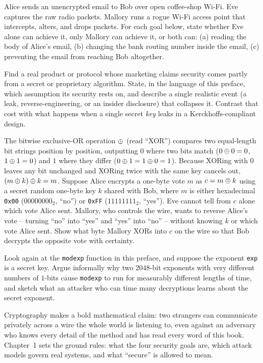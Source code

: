 \begin{exercise}
Alice sends an unencrypted email to Bob over open coffee-shop Wi-Fi. Eve captures the raw radio packets. Mallory runs a rogue Wi-Fi access point that intercepts, alters, and drops packets. For each goal below, state whether Eve alone can achieve it, only Mallory can achieve it, or both can: (a) reading the body of Alice's email, (b) changing the bank routing number inside the email, (c) preventing the email from reaching Bob altogether.
\end{exercise}

\begin{exercise}
Find a real product or protocol whose marketing claims security comes partly from a secret or proprietary algorithm. State, in the language of this preface, which assumption its security rests on, and describe a single realistic event (a leak, reverse-engineering, or an insider disclosure) that collapses it. Contrast that cost with what happens when a single secret \emph{key} leaks in a Kerckhoffs-compliant design.
\end{exercise}

\begin{exercise}
The bitwise exclusive-OR operation $\oplus$ (read ``XOR'') compares two equal-length bit strings position by position, outputting $0$ where two bits match ($0 \oplus 0 = 0$, $1 \oplus 1 = 0$) and $1$ where they differ ($0 \oplus 1 = 1 \oplus 0 = 1$). Because XORing with $0$ leaves any bit unchanged and XORing twice with the same key cancels out, $(m \oplus k) \oplus k = m$. Suppose Alice encrypts a one-byte vote $m$ as $c = m \oplus k$ using a secret random one-byte key $k$ shared with Bob, where $m$ is either hexadecimal \texttt{0x00} ($00000000_2$, ``no'') or \texttt{0xFF} ($11111111_2$, ``yes''). Eve cannot tell from $c$ alone which vote Alice sent. Mallory, who controls the wire, wants to reverse Alice's vote -- turning ``no'' into ``yes'' and ``yes'' into ``no'' -- without knowing $k$ or which vote Alice sent. Show what byte Mallory XORs into $c$ on the wire so that Bob decrypts the opposite vote with certainty.
\end{exercise}

\begin{exercise}
Look again at the \texttt{modexp} function in this preface, and suppose the exponent \texttt{exp} is a secret key. Argue informally why two $2048$-bit exponents with very different numbers of $1$-bits cause \texttt{modexp} to run for measurably different lengths of time, and sketch what an attacker who can time many decryptions learns about the secret exponent.
\end{exercise}

Cryptography makes a bold mathematical claim: two strangers can communicate privately across a wire the whole world is listening to, even against an adversary who knows every detail of the method and has read every word of this book. Chapter~1 sets the ground rules: what the four security goals are, which attack models govern real systems, and what ``secure'' is allowed to mean.

\chapterline
